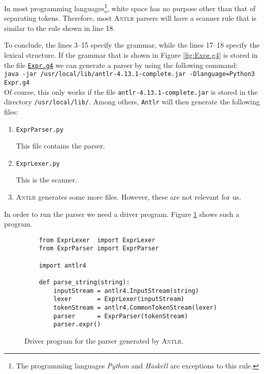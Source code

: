 \begin{enumerate}
      In most programming languages\footnote{
        The programming languages \textsl{Python} and \textsl{Haskell} are exceptions to this rule.},
      white space has no purpose other than that of separating  tokens.  
      Therefore, most \textsc{Antlr} parsers will have a scanner rule that is similar to
      the rule shown in line 18. 
\end{enumerate}
To conclude, the lines 3--15 specify the grammar, while the lines 17--18 specify the 
lexical structure.  If the grammar that is shown in Figure \ref{fig:Expr.g4} is stored in the file
\href{https://github.com/karlstroetmann/Formal-Languages/blob/master/ANTLR4-Python/PureExprParser/Expr.g4}{\texttt{Expr.g4}} 
we can generate a parser by using the following command:
\\[0.2cm]
\hspace*{1.3cm}
\texttt{java -jar /usr/local/lib/antlr-4.13.1-complete.jar -Dlanguage=Python3 Expr.g4}
\\[0.2cm]
Of course, this only works if the file \texttt{antlr-4.13.1-complete.jar} is stored in the directory
\texttt{/usr/local/lib/}.  Among others, \texttt{Antlr} will then generate the following files:
\begin{enumerate}
\item \texttt{ExprParser.py}

      This file contains the parser.
\item \texttt{ExprLexer.py}

      This is the scanner.
\item \textsc{Antlr} generates some more files.  However, these are not relevant for us.
\end{enumerate}

In order to run the parser we need a driver program.  Figure \ref{fig:PureParser.ipynb} shows such a program.

\begin{figure}[!ht]
\centering
\begin{verbatim}
    from ExprLexer  import ExprLexer
    from ExprParser import ExprParser
    
    import antlr4
    
    def parse_string(string): 
        inputStream = antlr4.InputStream(string)
        lexer       = ExprLexer(inputStream)
        tokenStream = antlr4.CommonTokenStream(lexer)
        parser      = ExprParser(tokenStream)
        parser.expr()
\end{verbatim}
\vspace*{-0.3cm}
\caption{Driver program for the parser generated by \textsc{Antlr}.}
\label{fig:PureParser.ipynb}
\end{figure}

